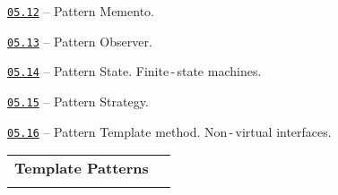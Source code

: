 \documentclass[a4paper,12pt]{article}
\renewenvironment{itemize}
{
    \begin{list}{\labelitemi}
    {
      \setlength{\topsep}{0pt}
      \setlength{\partopsep}{0pt}
      \setlength{\parskip}{0pt}
      \setlength{\itemsep}{0pt}
      \setlength{\parsep}{0pt}
      \setlength{\leftmargin}{14.5pt}
    }
}{\end{list}}
\begin{document}
\medskip\smallskip

\begin{itemize}

    \item \href{https://github.com/i-s-m-mipt/Education/blob/master/projects/examples/source/05.12.cpp}{\texttt{05.12}} -- Pattern Memento.

    \smallskip

    \item \href{https://github.com/i-s-m-mipt/Education/blob/master/projects/examples/source/05.13.cpp}{\texttt{05.13}} -- Pattern Observer.

    \smallskip

    \item \href{https://github.com/i-s-m-mipt/Education/blob/master/projects/examples/source/05.14.cpp}{\texttt{05.14}} -- Pattern State. Finite\,-\,state machines.

    \smallskip

    \item \href{https://github.com/i-s-m-mipt/Education/blob/master/projects/examples/source/05.15.cpp}{\texttt{05.15}} -- Pattern Strategy.

    \smallskip

    \item \href{https://github.com/i-s-m-mipt/Education/blob/master/projects/examples/source/05.16.cpp}{\texttt{05.16}} -- Pattern Template method. Non\,-\,virtual interfaces.

\end{itemize}

\bigskip\medskip

\begin{tabular}{!{\vrule width 1pt}L{3.7cm}!{\vrule width 1pt}L{15.3cm}!{\vrule width 0pt}} 


\textbf{Template Patterns} & \\


\end{tabular}

\medskip\smallskip
\end{document}
